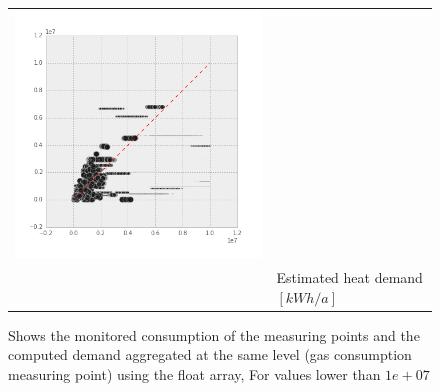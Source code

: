 \begin{figure}[htb]
\begin{tabular}{lccc}
 \includegraphics[width= 0.28\linewidth]{FIGURES/EcoFYS_07}\\
&\multicolumn{3}{l}{Estimated heat demand $[kWh/a]$}\\
 
\end{tabular}	
    \caption[Consumption vs. demand with float array]{Shows the monitored
        consumption of the measuring points and the computed demand aggregated
        at the same level (gas consumption measuring point) using the float
        array, For values lower than $1e+07$}
     \label{fig:con_dem_W07}
\end{figure}

